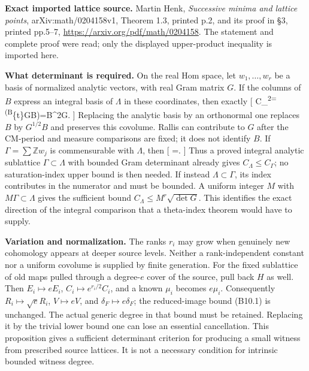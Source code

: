 \documentclass[11pt,a4paper]{article}
\theoremstyle{definition}
\begin{document}
\textbf{Exact imported lattice source.} Martin Henk, \emph{Successive
minima and lattice points}, arXiv:math/0204158v1, Theorem 1.3, printed
p.2, and its proof in §3, printed pp.5--7,
\url{https://arxiv.org/pdf/math/0204158}. The statement and complete
proof were read; only the displayed upper-product inequality is imported
here.

\textbf{What determinant is required.} On the real Hom space, let
\(w_1,\ldots,w_r\) be a basis of normalized analytic vectors, with real
Gram matrix \(G\). If the columns of \(B\) express an integral basis of
\(\Lambda\) in these coordinates, then exactly {[}
C\_\Lambda\textsuperscript{2=\det(B}\{\mathsf t\}GB)=\textbar{}\det B\textbar\^{}2\det G.
 {]} Replacing the analytic basis by an orthonormal one
replaces \(B\) by \(G^{1/2}B\) and preserves this covolume. Rallis can
contribute to \(G\) after the CM-period and measure comparisons are
fixed; it does not identify \(B\). If \(\Gamma=\sum\mathbb Zw_j\) is
commensurable with \(\Lambda\), then {[} 
=\frac{[\Gamma:\Gamma\cap\Lambda]}{[\Lambda:\Gamma\cap\Lambda]}. {]}
Thus a proved integral analytic sublattice \(\Gamma\subset\Lambda\) with
bounded Gram determinant already gives \(C_\Lambda\le C_\Gamma\); no
saturation-index upper bound is then needed. If instead
\(\Lambda\subset\Gamma\), its index contributes in the numerator and
must be bounded. A uniform integer \(M\) with \(M\Gamma\subset\Lambda\)
gives the sufficient bound \(C_\Lambda\le M^r\sqrt{\det G}\). This
identifies the exact direction of the integral comparison that a
theta-index theorem would have to supply.

\textbf{Variation and normalization.} The ranks \(r_i\) may grow when
genuinely new cohomology appears at deeper source levels. Neither a
rank-independent constant nor a uniform covolume is supplied by finite
generation. For the fixed sublattice of old maps pulled through a
degree-\(e\) cover of the source, pull back \(H\) as well. Then
\(E_i\mapsto eE_i\), \(C_i\mapsto e^{r_i/2}C_i\), and a known \(\mu_i\)
becomes \(e\mu_i\). Consequently \(R_i\mapsto\sqrt e R_i\),
\(V\mapsto eV\), and \(\delta_F\mapsto e\delta_F\); the reduced-image
bound (B10.1) is unchanged. The actual generic degree in that bound must
be retained. Replacing it by the trivial lower bound one can lose an
essential cancellation. This proposition gives a sufficient determinant
criterion for producing a small witness from prescribed source lattices.
It is not a necessary condition for intrinsic bounded witness degree.
\end{document}
